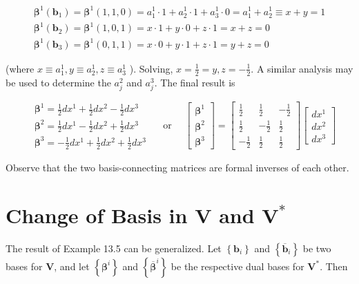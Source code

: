 \documentclass[10pt]{article}
\begin{document}
$$
\begin{array}{r}
\boldsymbol{\beta}^{1}\left(\mathbf{b}_{1}\right)=\boldsymbol{\beta}^{1}(1,1,0)=a_{1}^{1} \cdot 1+a_{2}^{1} \cdot 1+a_{3}^{1} \cdot 0=a_{1}^{1}+a_{2}^{1} \equiv x+y=1 \\
\boldsymbol{\beta}^{1}\left(\mathbf{b}_{2}\right)=\boldsymbol{\beta}^{1}(1,0,1)=x \cdot 1+y \cdot 0+z \cdot 1=x+z=0 \\
\boldsymbol{\beta}^{1}\left(\mathbf{b}_{3}\right)=\boldsymbol{\beta}^{1}(0,1,1)=x \cdot 0+y \cdot 1+z \cdot 1=y+z=0
\end{array}
$$

(where $x \equiv a_{1}^{1}, y \equiv a_{2}^{1}, z \equiv a_{3}^{1}$ ). Solving, $x=\frac{1}{2}=y, z=-\frac{1}{2}$. A similar analysis may be used to determine the $a_{j}^{2}$ and $a_{j}^{3}$. The final result is

$$
\begin{aligned}
& \boldsymbol{\beta}^{1}=\frac{1}{2} d x^{1}+\frac{1}{2} d x^{2}-\frac{1}{2} d x^{3} \\
& \boldsymbol{\beta}^{2}=\frac{1}{2} d x^{1}-\frac{1}{2} d x^{2}+\frac{1}{2} d x^{3} \\
& \boldsymbol{\beta}^{3}=-\frac{1}{2} d x^{1}+\frac{1}{2} d x^{2}+\frac{1}{2} d x^{3}
\end{aligned} \quad \text { or } \quad\left[\begin{array}{l}
\boldsymbol{\beta}^{1} \\
\boldsymbol{\beta}^{2} \\
\boldsymbol{\beta}^{3}
\end{array}\right]=\left[\begin{array}{rrr}
\frac{1}{2} & \frac{1}{2} & -\frac{1}{2} \\
\frac{1}{2} & -\frac{1}{2} & \frac{1}{2} \\
-\frac{1}{2} & \frac{1}{2} & \frac{1}{2}
\end{array}\right]\left[\begin{array}{l}
d x^{1} \\
d x^{2} \\
d x^{3}
\end{array}\right]
$$

Observe that the two basis-connecting matrices are formal inverses of each other.

\section*{Change of Basis in $\mathbf{V}$ and $\mathbf{V}^{*}$}
The result of Example 13.5 can be generalized. Let $\left\{\mathbf{b}_{i}\right\}$ and $\left\{\overline{\mathbf{b}}_{i}\right\}$ be two bases for $\mathbf{V}$, and let $\left\{\boldsymbol{\beta}^{i}\right\}$ and $\left\{\overline{\boldsymbol{\beta}}^{i}\right\}$ be the respective dual bases for $\mathbf{V}^{*}$. Then
\end{document}
